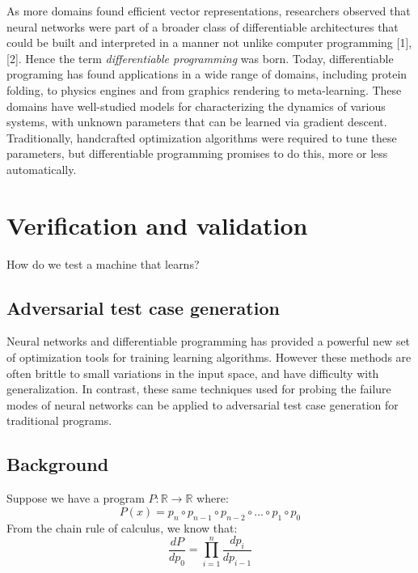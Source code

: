 \documentclass[12pt,initial,twoside,maitrise]{dms}
\numberwithin{equation}{section}
\numberwithin{table}{chapter}
\numberwithin{figure}{chapter}
\begin{document}
As more domains found efficient vector representations, researchers observed that neural networks were part of a broader class of differentiable architectures that could be built and interpreted in a manner not unlike computer programming [1], [2]. Hence the term \textit{differentiable programming} was born. Today, differentiable programing has found applications in a wide range of domains, including protein folding\cite{alquraishi2018end}, to physics engines\cite{de2018end,DBLP:journals_corr_DegraveHDW16} and from graphics rendering\cite{loper2014opendr} to meta-learning\cite{liu2018darts}. These domains have well-studied models for characterizing the dynamics of various systems, with unknown parameters that can be learned via gradient descent. Traditionally, handcrafted optimization algorithms were required to tune these parameters, but differentiable programming promises to do this, more or less automatically.

\chapter{Verification and validation}\label{ch:difftest}

How do we test a machine that learns?

\section{Adversarial test case generation}

Neural networks and differentiable programming has provided a powerful new set of optimization tools for training learning algorithms. However these methods are often brittle to small variations in the input space, and have difficulty with generalization. In contrast, these same techniques used for probing the failure modes of neural networks can be applied to adversarial test case generation for traditional programs.

\section{Background}

Suppose we have a program $P: \mathbb{R}\rightarrow\mathbb{R}$ where:
%
\begin{equation}
    P(x)=p_n \circ p_{n-1} \circ p_{n-2} \circ ... \circ p_1 \circ p_0
\end{equation}
%
From the chain rule of calculus, we know that:
%
\begin{equation}
    \frac{dP}{dp_0} = {\displaystyle \prod_{i=1}^{n} \frac{dp_{i}}{dp_{i-1}}}
\end{equation}
\end{document}
